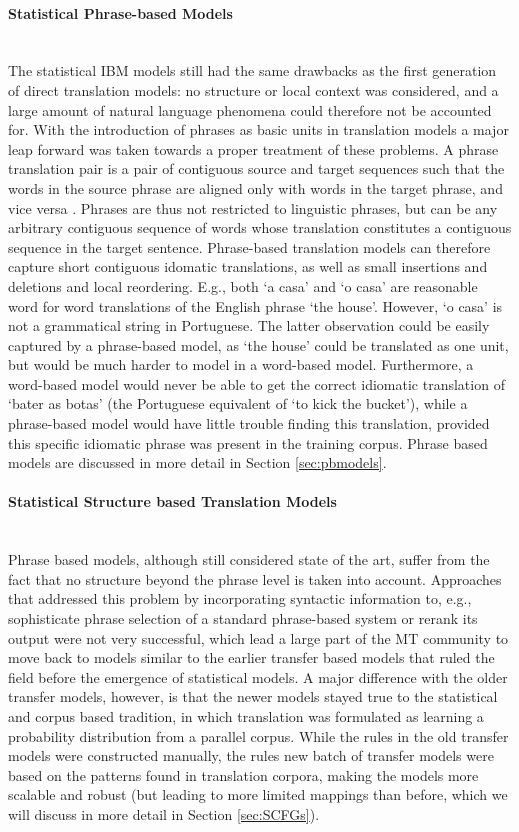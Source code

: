 \documentclass{report}
\newcommand{\myparagraph}[1]{\paragraph{#1}\mbox{}\\}
\theoremstyle{break}
\begin{document}
\myparagraph{Statistical Phrase-based Models}
The statistical IBM models still had the same drawbacks as the first generation of direct translation models: no structure or local context was considered, and a large amount of natural language phenomena could therefore not be accounted for. With the introduction of phrases as basic units in translation models \citep{wang1998grammar,och1999improved} a major leap forward was taken towards a proper treatment of these problems. A phrase translation pair is a pair of contiguous source and target sequences such that the words in the source phrase are aligned only with words in the target phrase, and vice versa \citep{och2000improved}. Phrases are thus not restricted to linguistic phrases, but can be any arbitrary contiguous sequence of words whose translation constitutes a contiguous sequence in the target sentence. Phrase-based translation models can therefore capture short contiguous idomatic translations, as well as small insertions and deletions and local reordering. E.g., both `a casa' and `o casa' are reasonable word for word translations of the English phrase `the house'. However, `o casa' is not a grammatical string in Portuguese. The latter observation could be easily captured by a phrase-based model, as `the house' could be translated as one unit, but would be much harder to model in a word-based model. Furthermore, a word-based model would never be able to get the correct idiomatic translation of `bater as botas' (the Portuguese equivalent of `to kick the bucket'), while a phrase-based model would have little trouble finding this translation, provided this specific idiomatic phrase was present in the training corpus. Phrase based models are discussed in more detail in Section \ref{sec:pbmodels}.

\myparagraph{Statistical Structure based Translation Models}
Phrase based models, although still considered state of the art, suffer from the fact that no structure beyond the phrase level is taken into account. Approaches that addressed this problem by incorporating syntactic information to, e.g., sophisticate phrase selection of a standard phrase-based system \citep{koehn2003statistical} or rerank its output \citep{och2004alignment} were not very successful, which lead a large part of the MT community to move back to models similar to the earlier transfer based models that ruled the field before the emergence of statistical models. A major difference with the older transfer models, however, is that the newer models stayed true to the statistical and corpus based tradition, in which translation was formulated as learning a probability distribution from a parallel corpus. While the rules in the old transfer models were constructed manually, the rules new batch of transfer models were based on the patterns found in translation corpora, making the models more scalable and robust (but leading to more limited mappings than before, which we will discuss in more detail in Section \ref{sec:SCFGs}).
\end{document}
